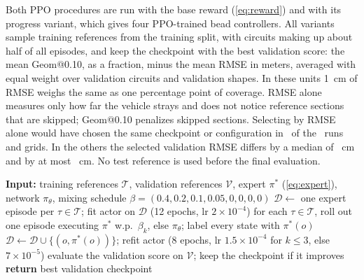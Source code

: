 \documentclass[conference]{IEEEtran}
\begin{document}
Both PPO procedures are run with the base reward (\ref{eq:reward}) and with its progress variant, which gives four PPO-trained bead controllers. All variants sample training references from the training split, with circuits making up about half of all episodes, and keep the checkpoint with the best validation score: the mean Geom@0.10, as a fraction, minus the mean RMSE in meters, averaged with equal weight over validation circuits and validation shapes. In these units 1~cm of RMSE weighs the same as one percentage point of coverage. RMSE alone measures only how far the vehicle strays and does not notice reference sections that are skipped; Geom@0.10 penalizes skipped sections. Selecting by RMSE alone would have chosen the same checkpoint or configuration in \VselSame\ of the \VselTotal\ runs and grids. In the others the selected validation RMSE differs by a median of \VselMedDiff~cm and by at most \VselMaxDiff~cm. No test reference is used before the final evaluation.

\begin{algorithm}[t]
\caption{Expert anchoring and DAgger refinement (Bead-DAgger)}
\label{alg:dagger}
\begin{algorithmic}[1]
\STATE \textbf{Input:} training references $\mathcal{T}$, validation references $\mathcal{V}$, expert $\pi^{*}$ (\ref{eq:expert}), network $\pi_\theta$, mixing schedule $\beta=(0.4,0.2,0.1,0.05,0,0,0,0)$
\STATE $\mathcal{D}\leftarrow$ one expert episode per $\tau\in\mathcal{T}$; fit actor on $\mathcal{D}$ (12 epochs, lr $2\times10^{-4}$)
\STATE for each $\tau\in\mathcal{T}$, roll out one episode executing $\pi^{*}$ w.p.\ $\beta_k$, else $\pi_\theta$; label every state with $\pi^{*}(o)$
\STATE $\mathcal{D}\leftarrow\mathcal{D}\cup\{(o,\pi^{*}(o))\}$; refit actor (8 epochs, lr $1.5\times10^{-4}$ for $k\le3$, else $7\times10^{-5}$)
\STATE evaluate the validation score on $\mathcal{V}$; keep the checkpoint if it improves
\ENDFOR
\STATE \textbf{return} best validation checkpoint
\end{algorithmic}
\end{algorithm}
\end{document}
